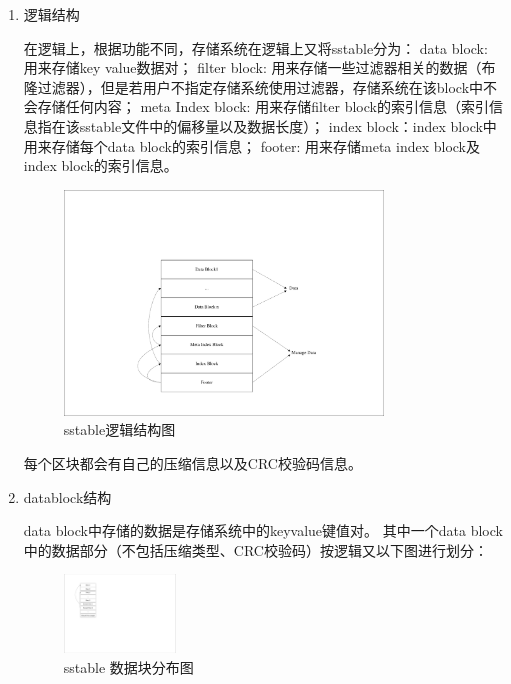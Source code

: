 \begin{enumerate}
\begin{enumerate}
					\item 逻辑结构
	
					在逻辑上，根据功能不同，存储系统在逻辑上又将sstable分为：
	data block: 用来存储key value数据对；
	filter block: 用来存储一些过滤器相关的数据（布隆过滤器），但是若用户不指定存储系统使用过滤器，存储系统在该block中不会存储任何内容；
	meta Index block: 用来存储filter block的索引信息（索引信息指在该sstable文件中的偏移量以及数据长度）；
	index block：index block中用来存储每个data block的索引信息；
	footer: 用来存储meta index block及index block的索引信息。
	
	\begin{figure}[H]
		\centering
		\includegraphics[width=0.80\textwidth]{pdf/sstable_logic.pdf}
		\caption{sstable逻辑结构图}
		\label{sstable_logic}
	\end{figure}
	
				每个区块都会有自己的压缩信息以及CRC校验码信息。
	
					\item datablock结构
	
					data block中存储的数据是存储系统中的keyvalue键值对。
					其中一个data block中的数据部分（不包括压缩类型、CRC校验码）按逻辑又以下图进行划分：
					
					\begin{figure}[H]
						\centering
						\includegraphics[width=0.28\textwidth]{pdf/datablock.pdf}
						\caption{sstable 数据块分布图}
						\label{sstable_data_block}
					\end{figure}
					

\end{enumerate}
\end{enumerate}
